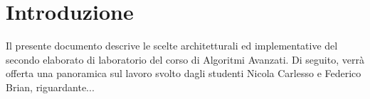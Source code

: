 \section{Introduzione}
Il presente documento descrive le scelte architetturali ed implementative del secondo elaborato di laboratorio del corso di Algoritmi Avanzati. Di seguito, verrà offerta una panoramica sul lavoro svolto dagli studenti Nicola Carlesso e Federico Brian, riguardante... 